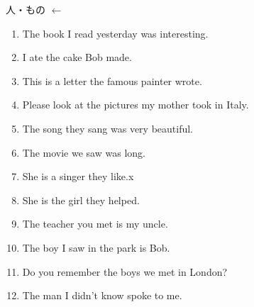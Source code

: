 \documentclass[aspectratio=169,xcolor={dvipsnames,table}]{beamer}
\begin{document}
\begin{frame}[plain,label=ichiran]{人・もの $\leftarrow$ }
 \begin{enumerate}
  \item The book  I read yesterday was interesting.%
\mbox{}\hfill{\scriptsize {}}
  \item I ate the cake  Bob made.
  \item This is a letter  the famous painter wrote.
  \item Please look at the pictures  my mother took in Italy.
  \item The song  they sang was very beautiful.
  \item The movie  we saw was long.
  \item She is a singer  they like.x

  \item She is the girl  they helped.
  \item The teacher  you met is my uncle.
  \item The boy  I saw in the park is Bob.
  \item Do you remember the boys  we met in London?
  \item The man  I didn't know spoke to me.
 \end{enumerate}
\end{frame}
\end{document}
